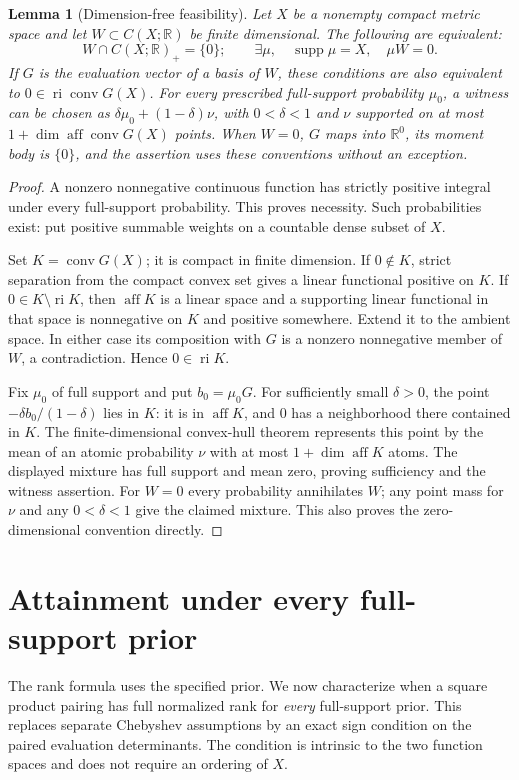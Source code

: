 \documentclass[11pt]{amsart}
\newtheorem{lemma}[theorem]{Lemma}
\theoremstyle{definition}\newtheorem{definition}[theorem]{Definition}
\theoremstyle{remark}\newtheorem{remark}[theorem]{Remark}
\newcommand{\R}{\mathbb R}\newcommand{\N}{\mathbb N}\newcommand{\C}{\mathbb C}
\begin{document}
\begin{lemma}[Dimension-free feasibility]
\label{lem:dimension-free-feasibility}
Let $X$ be a nonempty compact metric space and let $W\subset C(X;\R)$
be finite dimensional. The following are equivalent:
\[
 W\cap C(X;\R)_+=\{0\};\qquad
 \exists\mu,\quad\operatorname{supp}\mu=X,\quad\mu W=0.
\]
If $G$ is the evaluation vector of a basis of $W$, these conditions
are also equivalent to $0\in\operatorname{ri}\operatorname{conv}G(X)$.
For every prescribed full-support probability $\mu_0$, a witness can
be chosen as $\delta\mu_0+(1-\delta)\nu$, with $0<\delta<1$ and
$\nu$ supported on at most $1+\dim\operatorname{aff}\operatorname{conv}G(X)$
points. When $W=0$, $G$ maps into $\R^0$, its moment body is $\{0\}$,
and the assertion uses these conventions without an exception.
\end{lemma}
\begin{proof}
A nonzero nonnegative continuous function has strictly positive integral
under every full-support probability. This proves necessity. Such
probabilities exist: put positive summable weights on a countable dense
subset of $X$.

Set $K=\operatorname{conv}G(X)$; it is compact in finite dimension.
If $0\notin K$, strict separation from the compact convex set gives a
linear functional positive on $K$. If $0\in K\setminus\operatorname{ri}K$,
then $\operatorname{aff}K$ is a linear space and a supporting linear
functional in that space is nonnegative on $K$ and positive somewhere.
Extend it to the ambient space. In either case its composition with $G$
is a nonzero nonnegative member of $W$, a contradiction. Hence
$0\in\operatorname{ri}K$.

Fix $\mu_0$ of full support and put $b_0=\mu_0G$. For sufficiently
small $\delta>0$, the point $-\delta b_0/(1-\delta)$ lies in $K$:
it is in $\operatorname{aff}K$, and $0$ has a neighborhood there
contained in $K$. The finite-dimensional convex-hull theorem represents
this point by the mean of an atomic probability $\nu$ with at most
$1+\dim\operatorname{aff}K$ atoms. The displayed mixture has full
support and mean zero, proving sufficiency and the witness assertion.
For $W=0$ every probability annihilates $W$; any point mass for $\nu$
and any $0<\delta<1$ give the claimed mixture. This also proves the
zero-dimensional convention directly.
\end{proof}

\section{Attainment under every full-support prior}
\label{sec:v18-universal}
The rank formula uses the specified prior. We now characterize when a
square product pairing has full normalized rank for \emph{every}
full-support prior. This replaces separate Chebyshev assumptions by an
exact sign condition on the paired evaluation determinants. The condition
is intrinsic to the two function spaces and does not require an ordering
of $X$.
\end{document}
